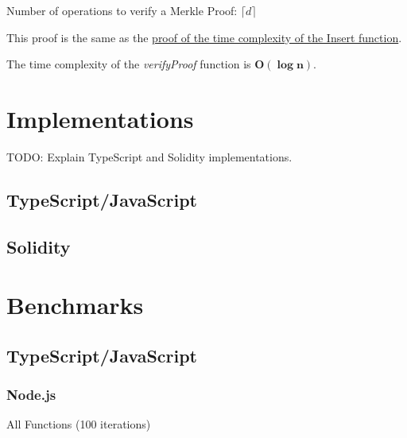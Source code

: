 \documentclass{article}
\begin{document}
Number of operations to verify a Merkle Proof: $\lceil d \rceil$

This proof is the same as the \hyperref[InsertProof]{proof of the time complexity of the Insert function}.

The time complexity of the \textit{verifyProof} function is $\boldsymbol{O(\log n)}$.



\section{Implementations}

TODO: Explain TypeScript and Solidity implementations.



\subsection{TypeScript/JavaScript}



\subsection{Solidity}



\section{Benchmarks}

\subsection{TypeScript/JavaScript}

\subsubsection{Node.js}


\datatable

\begin{table}[H]
    \centering
    \caption{All Functions (100 iterations)}
    \pgfplotstabletypeset[
        col sep=comma,
        header=true,
        string type, %
        every head row/.style={before row=\toprule, after row=\midrule},
        every last row/.style={after row=\bottomrule},
    ]{\datatable}
\end{table}
\end{document}
